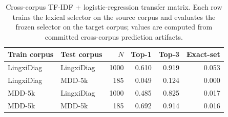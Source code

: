 \begin{table}[t]
\centering
\caption{Cross-corpus TF-IDF + logistic-regression transfer matrix. Each row trains the lexical selector on the source corpus and evaluates the frozen selector on the target corpus; values are computed from committed cross-corpus prediction artifacts.}
\label{tab:cross-corpus-tfidf}
\begin{tabular}{llrrrr}
\toprule
Train corpus & Test corpus & $N$ & Top-1 & Top-3 & Exact-set \\
\midrule
LingxiDiag & LingxiDiag & 1000 & 0.610 & 0.919 & 0.053 \\
LingxiDiag & MDD-5k & 185 & 0.049 & 0.124 & 0.000 \\
MDD-5k & LingxiDiag & 1000 & 0.485 & 0.825 & 0.017 \\
MDD-5k & MDD-5k & 185 & 0.692 & 0.914 & 0.016 \\
\bottomrule
\end{tabular}
\end{table}
